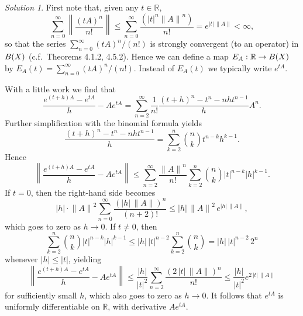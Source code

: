 \documentclass{report}
\newcommand{\bb}[1]{\mathbb{#1}}
\newcommand{\norm}[1]{{\lVert #1 \rVert}}
\newcommand{\snorm}[1]{\left\lVert #1 \right\rVert}
\let\sc\relax
\newcommand{\sc}[1]{\mathscr{#1}}
\theoremstyle{remark}
\newtheorem*{solution}{Solution}
\begin{document}
\begin{solution}
  First note that, given any $t \in \bb R$,
  \begin{equation*}
    \sum_{n=0}^\infty \snorm{\frac{(tA)^n}{n!}} \le \sum_{n=0}^\infty \frac{(|t|^n \norm{A}^n)}{n!} = e^{|t| \, \norm A} < \infty,
  \end{equation*}
  so that the series $\sum_{n=0}^\infty (tA)^n/(n!)$ is strongly convergent (to an operator) in $\sc B(X)$ (c.f.\ Theorems 4.1.2, 4.5.2). Hence we can define a map $E_A: \bb R \to \sc B(X)$ by $E_A(t) = \sum_{n=0}^\infty (tA)^n/(n!)$. Instead of $E_A(t)$ we typically write $e^{tA}$.

  With a little work we find that
  \begin{equation*}
    \frac{e^{(t+h)A} - e^{tA}}{h} - A e^{tA} = \sum_{n=2}^\infty \frac{1}{n!} \frac{(t+h)^n - t^n - nht^{n-1}}{h} A^n.
  \end{equation*}
  Further simplification with the binomial formula yields
  \begin{equation*}
    \frac{(t+h)^n - t^n - nht^{n-1}}{h} = \sum_{k=2}^n \binom{n}{k} t^{n-k} h^{k-1}.
  \end{equation*}
  Hence
  \begin{equation*}
    \snorm{\frac{e^{(t+h)A} - e^{tA}}{h} - A e^{tA}} \le \sum_{n=2}^\infty \frac{\norm{A}^n}{n!} \sum_{k=2}^n \binom{n}{k} |t|^{n-k} |h|^{k-1}.
  \end{equation*}
  If $t = 0$, then the right-hand side becomes
  \begin{equation*}
    |h| \cdot \norm{A}^2 \sum_{n=0}^\infty \frac{(|h| \, \norm{A})^n}{(n+2)!} \le |h| \, \norm{A}^2 \, e^{|h| \, \norm{A}},
  \end{equation*}
  which goes to zero as $h \to 0$. If $t \ne 0$, then
  \begin{equation*}
    \sum_{k=2}^n \binom{n}{k} |t|^{n-k} |h|^{k-1} \le |h| \, |t|^{n-2} \sum_{k=2}^n \binom{n}{k} = |h| \, |t|^{n-2} \, 2^n
  \end{equation*}
  whenever $|h| \le |t|$, yielding
  \begin{equation*}
    \snorm{\frac{e^{(t+h)A} - e^{tA}}{h} - A e^{tA}} \le \frac{|h|}{|t|^2} \sum_{n=2}^\infty \frac{(2 \, |t| \, \norm{A})^n}{n!} \le \frac{|h|}{|t|^2} e^{2 \, |t| \, \norm A}
  \end{equation*}
  for sufficiently small $h$, which also goes to zero as $h \to 0$. It follows that $e^{tA}$ is uniformly differentiable on $\bb R$, with derivative $A e^{tA}$.
\end{solution}
\end{document}
